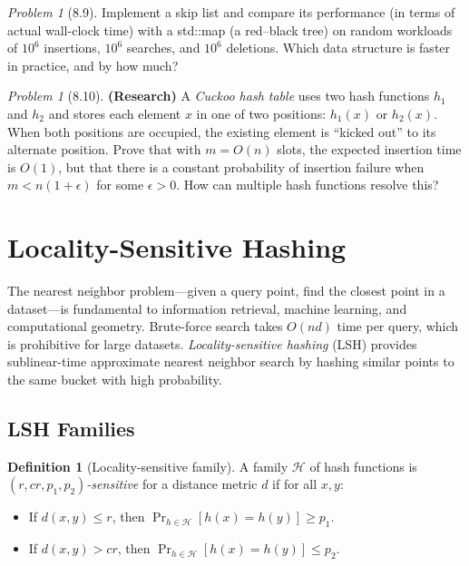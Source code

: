 \documentclass[twoside,12pt]{book}
\theoremstyle{plain}
\theoremstyle{definition}
\newtheorem{definition}[theorem]{Definition}
\theoremstyle{remark}
\newtheorem{problem}[theorem]{Problem}
\begin{document}
\begin{problem}[8.9]
Implement a skip list and compare its performance (in terms of actual wall-clock time) with a std::map (a red--black tree) on random workloads of $10^6$ insertions, $10^6$ searches, and $10^6$ deletions. Which data structure is faster in practice, and by how much?
\end{problem}

\begin{problem}[8.10]
\textbf{(Research)} A \emph{Cuckoo hash table} uses two hash functions $h_1$ and $h_2$ and stores each element $x$ in one of two positions: $h_1(x)$ or $h_2(x)$. When both positions are occupied, the existing element is ``kicked out'' to its alternate position. Prove that with $m = O(n)$ slots, the expected insertion time is $O(1)$, but that there is a constant probability of insertion failure when $m < n(1 + \epsilon)$ for some $\epsilon > 0$. How can multiple hash functions resolve this?
\end{problem}

\section{Locality-Sensitive Hashing}
\label{sec:lsh}

The nearest neighbor problem---given a query point, find the closest point in a dataset---is fundamental to information retrieval, machine learning, and computational geometry. Brute-force search takes $O(n d)$ time per query, which is prohibitive for large datasets. \emph{Locality-sensitive hashing} (LSH) provides sublinear-time approximate nearest neighbor search by hashing similar points to the same bucket with high probability.

\subsection{LSH Families}

\begin{definition}[Locality-sensitive family]
A family $\mathcal{H}$ of hash functions is \emph{$(r, cr, p_1, p_2)$-sensitive} for a distance metric $d$ if for all $x, y$:
\begin{itemize}[nosep]
  \item If $d(x,y) \leq r$, then $\Pr_{h \in \mathcal{H}}[h(x) = h(y)] \geq p_1$.
  \item If $d(x,y) > cr$, then $\Pr_{h \in \mathcal{H}}[h(x) = h(y)] \leq p_2$.
\end{itemize}
\end{definition}
\end{document}
